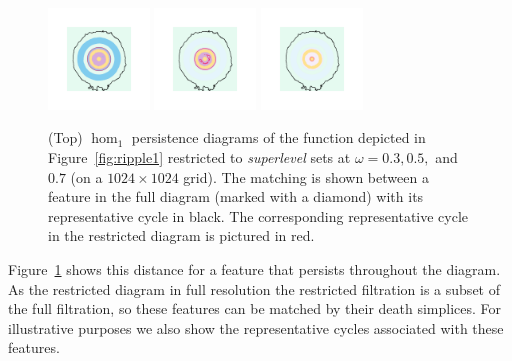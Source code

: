 \begin{figure}[htbp]
  \includegraphics[trim=500 500 500 500, clip, width=0.24\textwidth]{figures/matching2/surf_top-1_0.png}
  \includegraphics[trim=500 500 500 500, clip, width=0.24\textwidth]{figures/matching2/surf_top-1_1.png}
  \includegraphics[trim=500 500 500 500, clip, width=0.24\textwidth]{figures/matching2/surf_top-1_2.png}
  \caption{(Top) $\hom_1$ persistence diagrams of the function depicted in Figure~\ref{fig:ripple1} restricted to \emph{superlevel} sets at $\omega = 0.3, 0.5,$ and $0.7$ (on a $1024\times 1024$ grid).
  The matching is shown between a feature in the full diagram (marked with a diamond) with its representative cycle in black.
  The corresponding representative cycle in the restricted diagram is pictured in red.}\label{fig:restricted}
\end{figure}

Figure~\ref{fig:restricted} shows this distance for a feature that persists throughout the diagram.
As the restricted diagram in full resolution the restricted filtration is a subset of the full filtration, so these features can be matched by their death simplices.
For illustrative purposes we also show the representative cycles associated with these features.


